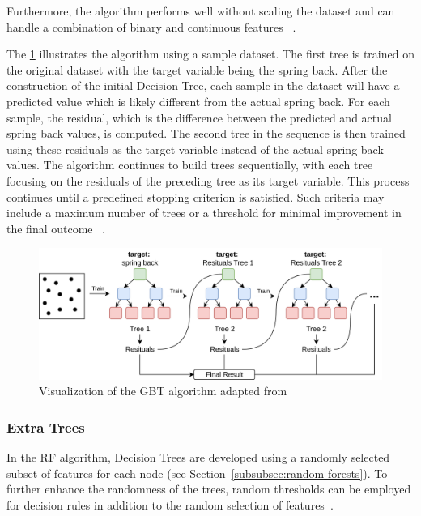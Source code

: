 Furthermore, the algorithm performs well without scaling the dataset and can handle a combination of binary and
continuous features
~\cite[p. 91]{muller2016introduction}.

The \cref{fig:gbr-example} illustrates the algorithm using a sample dataset.
The first tree is trained on the original dataset with the target variable being the spring back.
After the construction of the initial Decision Tree, each sample in the dataset will have a predicted value which is
likely
different from the actual spring back.
For each sample, the residual, which is the difference between the predicted and actual spring back values, is
computed.
The second tree in the sequence is then trained using these residuals as the target variable instead of the
actual spring back values.
The algorithm continues to build trees sequentially, with each tree focusing on the residuals of the preceding
tree as its target variable.
This process continues until a predefined stopping criterion is satisfied.
Such criteria may include a maximum number of trees or a threshold for minimal improvement in the final
outcome
~\cite[p. 227]{boehmke2019hands}.

\begin{figure}[h]
    \begin{tcolorbox}[arc=0pt,boxrule=0.5pt]
        \centering
        \includegraphics[width=1\textwidth]{chap4/images/gradient_boosting_example}
    \end{tcolorbox}
    \caption{Visualization of the \ac{GBT} algorithm adapted from~\cite[p. 222]{boehmke2019hands}}
    \label{fig:gbr-example}
\end{figure}

\subsubsection{Extra Trees}\label{subsubsec:extra-trees}
In the \ac{RF} algorithm, Decision Trees are developed using a randomly selected subset of features for
each node (see Section~\ref{subsubsec:random-forests}). To further enhance the randomness of the trees, random
thresholds can be employed for decision rules in addition to the random selection of
features~\cite[p. 351]{geron2022hands}.

